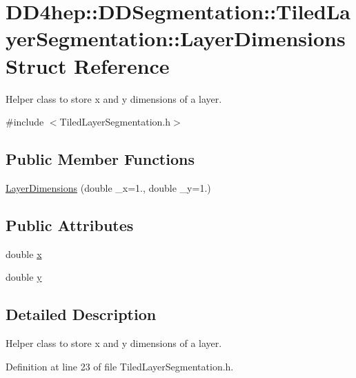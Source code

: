\hypertarget{struct_d_d4hep_1_1_d_d_segmentation_1_1_tiled_layer_segmentation_1_1_layer_dimensions}{
\section{DD4hep::DDSegmentation::TiledLayerSegmentation::LayerDimensions Struct Reference}
\label{struct_d_d4hep_1_1_d_d_segmentation_1_1_tiled_layer_segmentation_1_1_layer_dimensions}
}


Helper class to store x and y dimensions of a layer.  


{\ttfamily \#include $<$TiledLayerSegmentation.h$>$}\subsection*{Public Member Functions}
\begin{DoxyCompactItemize}
\item 
\hyperlink{struct_d_d4hep_1_1_d_d_segmentation_1_1_tiled_layer_segmentation_1_1_layer_dimensions_a947970ce64990889e5766b397fd0908e}{LayerDimensions} (double \_\-x=1., double \_\-y=1.)
\end{DoxyCompactItemize}
\subsection*{Public Attributes}
\begin{DoxyCompactItemize}
\item 
double \hyperlink{struct_d_d4hep_1_1_d_d_segmentation_1_1_tiled_layer_segmentation_1_1_layer_dimensions_ad7a5356dc198baab61c1a34fc38d22fc}{x}
\item 
double \hyperlink{struct_d_d4hep_1_1_d_d_segmentation_1_1_tiled_layer_segmentation_1_1_layer_dimensions_a11c49c068bf574008a598dd0fbd5df31}{y}
\end{DoxyCompactItemize}


\subsection{Detailed Description}
Helper class to store x and y dimensions of a layer. 

Definition at line 23 of file TiledLayerSegmentation.h.

